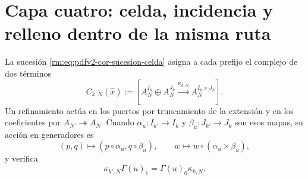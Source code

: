 \section{Capa cuatro: celda, incidencia y relleno dentro de la misma ruta}

La sucesión \eqref{rm:eq:pdfv2-cor-sucesion-celda} asigna a cada prefijo el
complejo de dos términos
\begin{equation}
\label{rm:eq:pdfv2-cor-cono-celda}
 C_{k,N}(\widehat x):=
 \left[A_N^{I_k}\oplus A_N^{J_k}
 \xrightarrow{\kappa_{k,N}}A_N^{I_k\times J_k}\right].
\end{equation}
Un refinamiento actúa en los puertos por truncamiento de la extensión y en
los coeficientes por \(A_{N'}\twoheadrightarrow A_N\). Cuando
\(\alpha_u:I_{k'}\to I_k\) y \(\beta_u:J_{k'}\to J_k\) son esos mapas, su
acción en generadores es
\begin{equation}
\label{rm:eq:pdfv2-cor-refinamiento-celda}
 (p,q)\longmapsto(p\circ\alpha_u,q\circ\beta_u),
 \qquad
 w\longmapsto w\circ(\alpha_u\times\beta_u),
\end{equation}
y verifica
\begin{equation}
\label{rm:eq:pdfv2-cor-refinamiento-cadena}
 \kappa_{k',N}\Gamma(u)_1=\Gamma(u)_0\kappa_{k,N}.
\end{equation}

